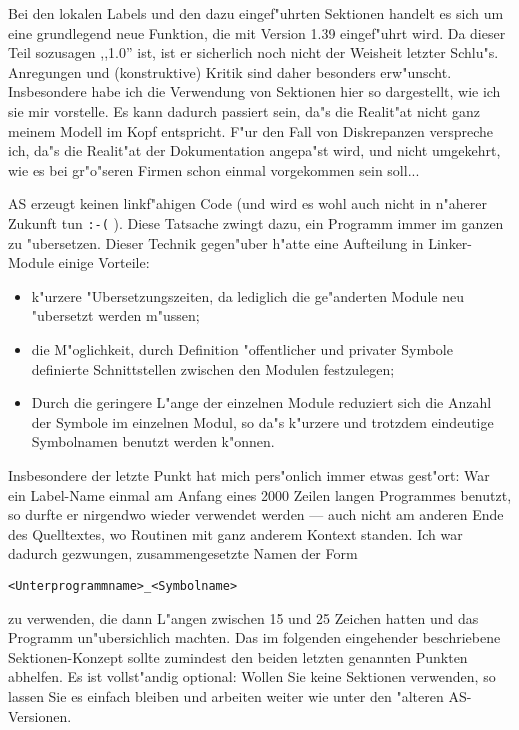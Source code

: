 \documentclass[12pt,a4paper,twoside]{report}
\newcommand{\tty}[1]{{\tt #1}}
\begin{document}
Bei den lokalen Labels und den dazu eingef"uhrten Sektionen handelt es
sich um eine grundlegend neue Funktion, die mit Version 1.39 eingef"uhrt
wird.  Da dieser Teil sozusagen ,,1.0'' ist, ist er sicherlich noch nicht
der Weisheit letzter Schlu"s.  Anregungen und (konstruktive) Kritik sind
daher besonders erw"unscht.  Insbesondere habe ich die Verwendung von
Sektionen hier so dargestellt, wie ich sie mir vorstelle.  Es kann dadurch
passiert sein, da"s die Realit"at nicht ganz meinem Modell im Kopf entspricht.
F"ur den Fall von Diskrepanzen verspreche ich, da"s die Realit"at der
Dokumentation angepa"st wird, und nicht umgekehrt, wie es bei gr"o"seren
Firmen schon einmal vorgekommen sein soll...
\par
AS erzeugt keinen linkf"ahigen Code (und wird es wohl auch nicht in n"aherer
Zukunft tun \tty{:-(} ).  Diese Tatsache zwingt dazu, ein Programm immer im ganzen
zu "ubersetzen.  Dieser Technik gegen"uber h"atte eine Aufteilung in
Linker-Module einige Vorteile:
\begin{itemize}
\item{k"urzere "Ubersetzungszeiten, da lediglich die ge"anderten Module
      neu "ubersetzt werden m"ussen;}
\item{die M"oglichkeit, durch Definition "offentlicher und privater
      Symbole definierte Schnittstellen zwischen den Modulen festzulegen;}
\item{Durch die geringere L"ange der einzelnen Module reduziert sich die
      Anzahl der Symbole im einzelnen Modul, so da"s k"urzere und trotzdem
      eindeutige Symbolnamen benutzt werden k"onnen.}
\end{itemize}
Insbesondere der letzte Punkt hat mich pers"onlich immer etwas gest"ort:
War ein Label-Name einmal am Anfang eines 2000 Zeilen langen Programmes
benutzt, so durfte er nirgendwo wieder verwendet werden --- auch nicht am
anderen Ende des Quelltextes, wo Routinen mit ganz anderem Kontext standen.
Ich war dadurch gezwungen, zusammengesetzte Namen der Form
\begin{verbatim}
<Unterprogrammname>_<Symbolname>
\end{verbatim}
zu verwenden, die dann L"angen zwischen 15 und 25 Zeichen hatten und das
Programm un"ubersichlich machten.
Das im folgenden eingehender beschriebene Sektionen-Konzept sollte zumindest
den beiden letzten genannten Punkten abhelfen.  Es ist vollst"andig optional:
Wollen Sie keine Sektionen verwenden, so lassen Sie es einfach bleiben
und arbeiten weiter wie unter den "alteren AS-Versionen.
\end{document}
